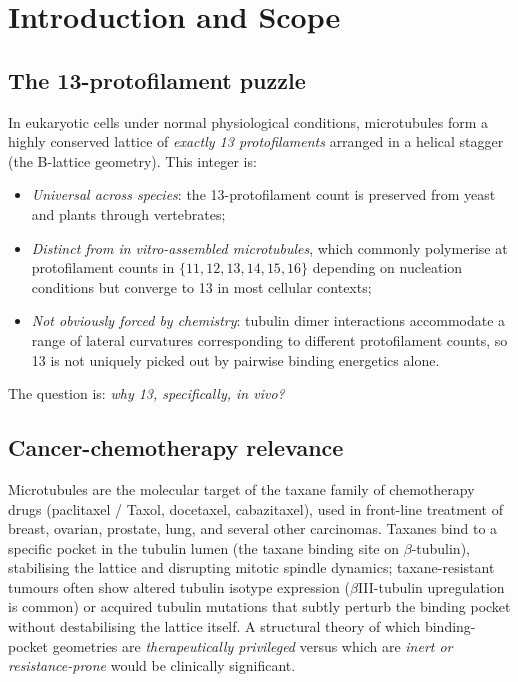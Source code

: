 \documentclass[12pt]{article}
\begin{document}
\section{Introduction and Scope}\label{sec:intro}

\subsection{The 13-protofilament puzzle}

In eukaryotic cells under normal physiological conditions,
microtubules form a highly conserved lattice of \emph{exactly
13 protofilaments} arranged in a helical stagger (the B-lattice
geometry). This integer is:
\begin{itemize}
\item \emph{Universal across species}: the 13-protofilament count
  is preserved from yeast and plants through vertebrates;
\item \emph{Distinct from in vitro-assembled microtubules}, which
  commonly polymerise at protofilament counts in
  $\{11, 12, 13, 14, 15, 16\}$ depending on nucleation conditions
  but converge to 13 in most cellular contexts;
\item \emph{Not obviously forced by chemistry}: tubulin dimer
  interactions accommodate a range of lateral curvatures
  corresponding to different protofilament counts, so 13 is not
  uniquely picked out by pairwise binding energetics alone.
\end{itemize}
The question is: \emph{why 13, specifically, in vivo?}

\subsection{Cancer-chemotherapy relevance}

Microtubules are the molecular target of the taxane family of
chemotherapy drugs (paclitaxel / Taxol, docetaxel, cabazitaxel),
used in front-line treatment of breast, ovarian, prostate, lung,
and several other carcinomas. Taxanes bind to a specific pocket
in the tubulin lumen (the taxane binding site on
$\beta$-tubulin), stabilising the lattice and disrupting mitotic
spindle dynamics; taxane-resistant tumours often show altered
tubulin isotype expression ($\beta$III-tubulin upregulation is
common) or acquired tubulin mutations that subtly perturb the
binding pocket without destabilising the lattice itself. A
structural theory of which binding-pocket geometries are
\emph{therapeutically privileged} versus which are \emph{inert or
resistance-prone} would be clinically significant.
\end{document}
